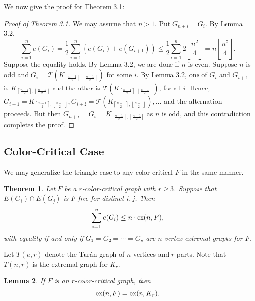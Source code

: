 \documentclass[a4paper]{article}
\newtheorem{theorem}{Theorem}[section]
\newtheorem{lemma}[theorem]{Lemma}
\begin{document}
We now give the proof for Theorem 3.1:

\begin{proof}[Proof of Theorem 3.1]
  We may assume that $n > 1$. Put $G_{n + i} = G_i$. By Lemma 3.2,
  \[
    \sum_{i = 1}^n e(G_i) = \frac{1}{2}\sum_{i = 1}^n (e(G_i) + e(G_{i + 1})) \leq \frac{1}{2}\sum_{i = 1}^n 2\left\lfloor\frac{n^2}{4}\right\rfloor = n\left\lfloor\frac{n^2}{4}\right\rfloor.
  \]
  Suppose the equality holds. By Lemma 3.2, we are done if $n$ is even. Suppose $n$ is odd and $G_i
   = \mathcal{T}(K_{\left\lceil\frac{n -
  1}{2}\right\rceil, \left\lfloor\frac{n - 1}{2}\right\rfloor})$ for some $i$. By Lemma 3.2, one of $G_i$ and $G_{i + 1}$ is
   $K_{\left\lceil\frac{n - 1}{2}\right\rceil, \left\lfloor\frac{n - 1}{2}\right\rfloor}$ and the
   other is $\mathcal{T}(K_{\left\lceil\frac{n -
  1}{2}\right\rceil, \left\lfloor\frac{n - 1}{2}\right\rfloor})$, for all $i$. Hence, $G_{i + 1} = K_{\left\lceil\frac{n -
   1}{2}\right\rceil, \left\lfloor\frac{n - 1}{2}\right\rfloor}, G_{i + 2} = \mathcal{T}(K_{\left\lceil\frac{n -
  1}{2}\right\rceil, \left\lfloor\frac{n - 1}{2}\right\rfloor}), \ldots$
   and the alternation proceeds. But then $G_{n + i} = G_i = K_{\left\lceil\frac{n -
   1}{2}\right\rceil, \left\lfloor\frac{n - 1}{2}\right\rfloor}$ as $n$ is odd, and this
   contradiction completes the proof.
\end{proof}

\subsection{Color-Critical Case}

We may generalize the triangle case to any color-critical $F$ in the same manner. 

\begin{theorem}
  Let $F$ be a $r$-color-critical graph with $r \geq 3$. Suppose that $E(G_i) \cap E(G_j)$ is
  $F$-free for distinct $i, j$. Then
  \[
    \sum_{i = 1}^n e(G_i) \leq n \cdot \textnormal{ex}(n, F),
  \]
  with equality if and only if $G_1 = G_2 = \cdots = G_n$ are $n$-vertex extremal graphs for $F$.
\end{theorem}

Let $T(n, r)$ denote the Turán graph of $n$ vertices and $r$ parts. Note that $T(n, r)$ is the
extremal graph for $K_r$. 

\begin{lemma}
  If $F$ is an $r$-color-critical graph, then
  \[
    \textnormal{ex}(n, F) = \textnormal{ex}(n, K_{r}).
  \]
\end{lemma}
\end{document}
